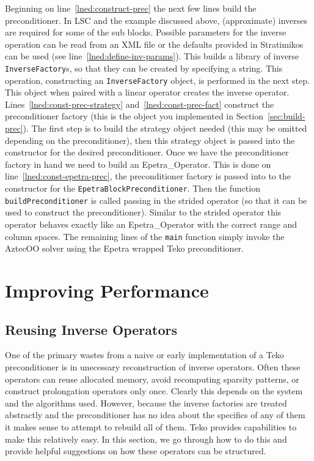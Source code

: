 \documentclass[12pt]{article}
\newcommand{\code}[1]{\lstinline[basicstyle=\footnotesize]!#1!}
\begin{document}
Beginning on line~\ref{lned:construct-prec} the next few lines build the preconditioner.
In LSC and the example discussed above, (approximate) inverses are required for some of the
sub blocks.  Possible parameters for the inverse operation can be read from an XML
file or the defaults provided in Stratimikos can be used (see line~\ref{lned:define-inv-params}). 
This builds a library of inverse \code{InverseFactory}s, so that they can be created
by specifying a string. This operation, constructing an \code{InverseFactory} object, 
is performed in the next step.
This object when paired with a linear operator creates
the inverse operator. Lines~\ref{lned:const-prec-strategy} and~\ref{lned:const-prec-fact}
construct the preconditioner factory (this is the object you implemented in Section~\ref{sec:build-prec}).
The first step is to build the strategy object needed (this may be omitted depending on
the preconditioner), then this strategy object is passed into the constructor for the
desired preconditioner. Once we have the preconditioner factory in hand we need to
build an Epetra\_Operator. This is done on line~\ref{lned:const-epetra-prec}, the preconditioner
factory is passed into to the constructor for the \code{EpetraBlockPreconditioner}. Then
the function \code{buildPreconditioner} is called passing in the strided operator (so that
it can be used to construct the preconditioner). Similar to the strided operator this operator
behaves exactly like an Epetra\_Operator with the correct range and column spaces.
The remaining lines of the \code{main} function simply invoke the AztecOO solver using
the Epetra wrapped Teko preconditioner.

\section{Improving Performance}

\subsection{Reusing Inverse Operators}
One of the primary wastes from a naive or early implementation of a Teko preconditioner
is in unecessary reconstruction of inverse operators. Often these operators can reuse
allocated memory, avoid recomputing sparsity patterns, or construct prolongation operators
only once. Clearly this depends on the system and the algorithms used.  However, because
the inverse factories are treated abstractly and the preconditioner has no idea about the
specifics of any of them it makes sense to attempt to rebuild all of them. Teko provides
capabilities to make this relatively easy. In this section, we go through how to do this
and provide helpful suggestions on how these operators can be structured.
\end{document}
